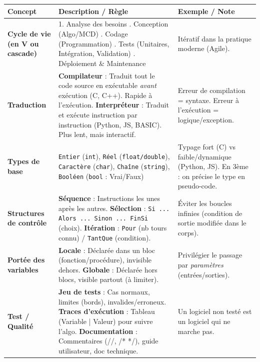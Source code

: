 \documentclass[11pt]{article}
\begin{document}
\begin{bilan}
\begin{center}
\begin{tabularx}{\linewidth}{|>{\bfseries}l|X|X|}
\hline
\rowcolor{popblueL}
\textbf{Concept} & \textbf{Description / Règle} & \textbf{Exemple / Note} \\
\hline
\textbf{Cycle de vie (en V ou cascade)} & 1. Analyse des besoins \newline 2. Conception (Algo/MCD) \newline 3. Codage (Programmation) \newline 4. Tests (Unitaires, Intégration, Validation) \newline 5. Déploiement \& Maintenance & Itératif dans la pratique moderne (Agile). \\
\hline
\textbf{Traduction} & \textbf{Compilateur} : Traduit tout le code source en exécutable \emph{avant} exécution (C, C++). Rapide à l'exécution. \newline \textbf{Interpréteur} : Traduit et exécute instruction par instruction (Python, JS, BASIC). Plus lent, mais interactif. & Erreur de compilation = syntaxe. Erreur à l'exécution = logique/exception. \\
\hline
\textbf{Types de base} & \texttt{Entier} (\texttt{int}), \texttt{Réel} (\texttt{float/double}), \texttt{Caractère} (\texttt{char}), \texttt{Chaîne} (\texttt{string}), \texttt{Booléen} (\texttt{bool} : Vrai/Faux) & Typage fort (C) vs faible/dynamique (Python, JS). En 3ème : on précise le type en pseudo-code. \\
\hline
\textbf{Structures de contrôle} & \textbf{Séquence} : Instructions les unes après les autres. \newline \textbf{Sélection} : \texttt{Si ... Alors ... Sinon ... FinSi} (choix). \newline \textbf{Itération} : \texttt{Pour} (nb tours connu) / \texttt{TantQue} (condition). & Éviter les boucles infinies (condition de sortie modifiée dans le corps). \\
\hline
\textbf{Portée des variables} & \textbf{Locale} : Déclarée dans un bloc (fonction/procédure), invisible dehors. \newline \textbf{Globale} : Déclarée hors blocs, visible partout (à limiter). & Privilégier le passage par \emph{paramètres} (entrées/sorties). \\
\hline
\textbf{Test / Qualité} & \textbf{Jeu de tests} : Cas normaux, limites (bords), invalides/erroneux. \newline \textbf{Traces d'exécution} : Tableau (Variable | Valeur) pour suivre l'algo. \newline \textbf{Documentation} : Commentaires (//, /* */), guide utilisateur, doc technique. & Un logiciel non testé est un logiciel qui ne marche pas. \\
\hline
\end{tabularx}
\end{center}


\end{bilan}
\end{document}
